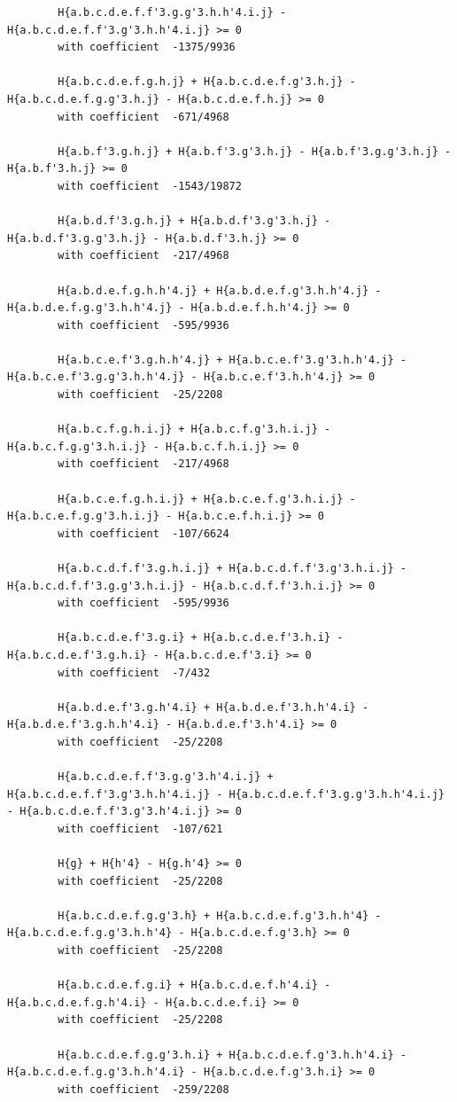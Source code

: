 \documentclass[11pt, a4paper]{kybernetika}
\begin{document}
\begin{verbatim}
		H{a.b.c.d.e.f.f'3.g.g'3.h.h'4.i.j} - H{a.b.c.d.e.f.f'3.g'3.h.h'4.i.j} >= 0
		with coefficient  -1375/9936
		
		H{a.b.c.d.e.f.g.h.j} + H{a.b.c.d.e.f.g'3.h.j} - H{a.b.c.d.e.f.g.g'3.h.j} - H{a.b.c.d.e.f.h.j} >= 0
		with coefficient  -671/4968
		
		H{a.b.f'3.g.h.j} + H{a.b.f'3.g'3.h.j} - H{a.b.f'3.g.g'3.h.j} - H{a.b.f'3.h.j} >= 0
		with coefficient  -1543/19872
		
		H{a.b.d.f'3.g.h.j} + H{a.b.d.f'3.g'3.h.j} - H{a.b.d.f'3.g.g'3.h.j} - H{a.b.d.f'3.h.j} >= 0
		with coefficient  -217/4968
		
		H{a.b.d.e.f.g.h.h'4.j} + H{a.b.d.e.f.g'3.h.h'4.j} - H{a.b.d.e.f.g.g'3.h.h'4.j} - H{a.b.d.e.f.h.h'4.j} >= 0
		with coefficient  -595/9936
		
		H{a.b.c.e.f'3.g.h.h'4.j} + H{a.b.c.e.f'3.g'3.h.h'4.j} - H{a.b.c.e.f'3.g.g'3.h.h'4.j} - H{a.b.c.e.f'3.h.h'4.j} >= 0
		with coefficient  -25/2208
		
		H{a.b.c.f.g.h.i.j} + H{a.b.c.f.g'3.h.i.j} - H{a.b.c.f.g.g'3.h.i.j} - H{a.b.c.f.h.i.j} >= 0
		with coefficient  -217/4968
		
		H{a.b.c.e.f.g.h.i.j} + H{a.b.c.e.f.g'3.h.i.j} - H{a.b.c.e.f.g.g'3.h.i.j} - H{a.b.c.e.f.h.i.j} >= 0
		with coefficient  -107/6624
		
		H{a.b.c.d.f.f'3.g.h.i.j} + H{a.b.c.d.f.f'3.g'3.h.i.j} - H{a.b.c.d.f.f'3.g.g'3.h.i.j} - H{a.b.c.d.f.f'3.h.i.j} >= 0
		with coefficient  -595/9936
		
		H{a.b.c.d.e.f'3.g.i} + H{a.b.c.d.e.f'3.h.i} - H{a.b.c.d.e.f'3.g.h.i} - H{a.b.c.d.e.f'3.i} >= 0
		with coefficient  -7/432
		
		H{a.b.d.e.f'3.g.h'4.i} + H{a.b.d.e.f'3.h.h'4.i} - H{a.b.d.e.f'3.g.h.h'4.i} - H{a.b.d.e.f'3.h'4.i} >= 0
		with coefficient  -25/2208
		
		H{a.b.c.d.e.f.f'3.g.g'3.h'4.i.j} + H{a.b.c.d.e.f.f'3.g'3.h.h'4.i.j} - H{a.b.c.d.e.f.f'3.g.g'3.h.h'4.i.j} - H{a.b.c.d.e.f.f'3.g'3.h'4.i.j} >= 0
		with coefficient  -107/621
		
		H{g} + H{h'4} - H{g.h'4} >= 0
		with coefficient  -25/2208
		
		H{a.b.c.d.e.f.g.g'3.h} + H{a.b.c.d.e.f.g'3.h.h'4} - H{a.b.c.d.e.f.g.g'3.h.h'4} - H{a.b.c.d.e.f.g'3.h} >= 0
		with coefficient  -25/2208
		
		H{a.b.c.d.e.f.g.i} + H{a.b.c.d.e.f.h'4.i} - H{a.b.c.d.e.f.g.h'4.i} - H{a.b.c.d.e.f.i} >= 0
		with coefficient  -25/2208
		
		H{a.b.c.d.e.f.g.g'3.h.i} + H{a.b.c.d.e.f.g'3.h.h'4.i} - H{a.b.c.d.e.f.g.g'3.h.h'4.i} - H{a.b.c.d.e.f.g'3.h.i} >= 0
		with coefficient  -259/2208
		

\end{verbatim}
\end{document}
